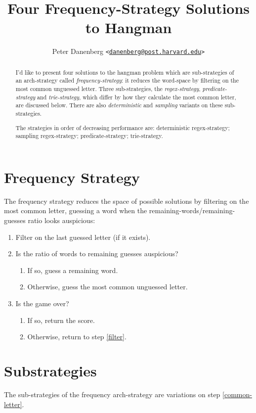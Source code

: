 \documentclass{article}
\title{Four Frequency-Strategy Solutions to Hangman}
\author{Peter Danenberg
  \texttt{<}\href{mailto:danenberg@post.harvard.edu}
  {\nolinkurl{danenberg@post.harvard.edu}}\texttt{>}}
\begin{document}
\maketitle
\begin{abstract}
I'd like to present four solutions to the hangman problem which are
sub-strategies of an arch-strategy called \emph{frequency-strategy}:
it reduces the word-space by filtering on the most common unguessed
letter. Three sub-strategies, the \emph{regex-strategy},
\emph{predicate-strategy} and \emph{trie-strategy}, which differ by
how they calculate the most common letter, are discussed below. There
are also \emph{deterministic} and \emph{sampling} variants on
these sub-strategies.

The strategies in order of decreasing performance are: deterministic
regex-strategy; sampling regex-strategy; predicate-strategy;
trie-strategy.
\end{abstract}
\tableofcontents
\section{Frequency Strategy}
The frequency strategy reduces the space of possible solutions by
filtering on the most common letter, guessing a word when the
remaining-words/remaining-guesses ratio looks auspicious:

\begin{enumerate}
\item \label{filter} Filter on the last guessed letter (if it exists).
\item Is the ratio of words to remaining guesses auspicious?
  \begin{enumerate}
  \item If so, guess a remaining word.
  \item \label{common-letter} Otherwise, guess the most common unguessed letter.
  \end{enumerate}
\item Is the game over?
  \begin{enumerate}
  \item If so, return the score.
  \item Otherwise, return to step \ref{filter}.
  \end{enumerate}
\end{enumerate}

\section{Substrategies}
The sub-strategies of the frequency arch-strategy are variations on
step \ref{common-letter}.
\end{document}
